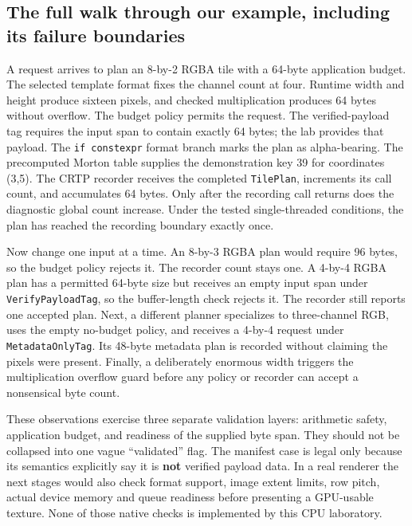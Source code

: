 \subsection{The full walk through our example, including its failure boundaries}\label{05-engine-i-ch005-the-full-walk-through-our-example-including-its-failure-boundaries}

A request arrives to plan an 8-by-2 RGBA tile with a 64-byte application budget. The selected template format fixes the channel count at four. Runtime width and height produce sixteen pixels, and checked multiplication produces 64 bytes without overflow. The budget policy permits the request. The verified-payload tag requires the input span to contain exactly 64 bytes; the lab provides that payload. The \texttt{if\ constexpr} format branch marks the plan as alpha-bearing. The precomputed Morton table supplies the demonstration key 39 for coordinates (3,5). The CRTP recorder receives the completed \texttt{TilePlan}, increments its call count, and accumulates 64 bytes. Only after the recording call returns does the diagnostic global count increase. Under the tested single-threaded conditions, the plan has reached the recording boundary exactly once.

Now change one input at a time. An 8-by-3 RGBA plan would require 96 bytes, so the budget policy rejects it. The recorder count stays one. A 4-by-4 RGBA plan has a permitted 64-byte size but receives an empty input span under \texttt{VerifyPayloadTag}, so the buffer-length check rejects it. The recorder still reports one accepted plan. Next, a different planner specializes to three-channel RGB, uses the empty no-budget policy, and receives a 4-by-4 request under \texttt{MetadataOnlyTag}. Its 48-byte metadata plan is recorded without claiming the pixels were present. Finally, a deliberately enormous width triggers the multiplication overflow guard before any policy or recorder can accept a nonsensical byte count.

These observations exercise three separate validation layers: arithmetic safety, application budget, and readiness of the supplied byte span. They should not be collapsed into one vague ``validated'' flag. The manifest case is legal only because its semantics explicitly say it is \textbf{not} verified payload data. In a real renderer the next stages would also check format support, image extent limits, row pitch, actual device memory and queue readiness before presenting a GPU-usable texture. None of those native checks is implemented by this CPU laboratory.

